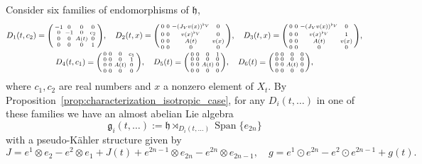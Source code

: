 \documentclass{article}
\theoremstyle{definition}
\newcommand{\frh}{\mathfrak{h}}
\newcommand{\Span}[1]{\operatorname{Span}\{#1\}}
\newcommand{\lie}[1]{\mathfrak{#1}}
\newcommand{\g}{\lie g}
\newenvironment{smallpmatrix}{\left(\begin{smallmatrix}}{\end{smallmatrix}\right)}
\begin{document}
\begin{itemize}
    Consider six families of endomorphisms of $\frh$,\begin{gather*}
    D_1(t,c_2)=\begin{smallpmatrix}
        -1 & 0 & 0 & 0\\
        0 & -1 & 0 & c_2\\
        0 & 0& A(t) & 0\\
        0 & 0 & 0 & 1
    \end{smallpmatrix},\quad D_2(t,x)=\begin{smallpmatrix}
        0 & 0 & -(J_Vv(x))^{\flat_V} & 0\\
        0 & 0 & v(x)^{\flat_V} & 0\\
        0 & 0& A(t) & v(x)\\
        0 & 0 & 0 & 0
    \end{smallpmatrix},\quad D_3(t,x)=\begin{smallpmatrix}
        0 & 0 & -(J_Vv(x))^{\flat_V} & 0\\
        0 & 0 & v(x)^{\flat_V} & 1\\
        0 & 0& A(t) & v(x)\\
        0 & 0 & 0 & 0
    \end{smallpmatrix},\\
    D_4(t,c_1)=\begin{smallpmatrix}
        0 & 0 & 0 & c_1\\
        0 & 0 & 0 & 1\\
        0 & 0& A(t) & 0\\
        0 & 0 & 0 & 0
    \end{smallpmatrix}, \quad D_5(t)=\begin{smallpmatrix}
        0 & 0 & 0 & 1\\
        0 & 0 & 0 & 0\\
        0 & 0& A(t) & 0\\
        0 & 0 & 0 & 0
    \end{smallpmatrix},\quad D_6(t)=\begin{smallpmatrix}
        0 & 0 & 0 & 0\\
        0 & 0 & 0 & 0\\
        0 & 0& A(t) & 0\\
        0 & 0 & 0 & 0
    \end{smallpmatrix},
    \end{gather*} where $c_1,c_2$ are real numbers and $x$ a nonzero element of $X_t$. By Proposition~\ref{prop:characterization_isotropic_case}, for any $D_i(t,\dots)$ in one of these families we have an almost abelian Lie algebra $$\g_i(t,\dots):=\frh\rtimes_{D_i(t,\dots)}\Span{e_{2n}}$$ with a pseudo-Kähler structure given by $$J=e^1\otimes e_2-e^2\otimes e_1+J(t)+e^{2n-1}\otimes e_{2n}-e^{2n}\otimes e_{2n-1}, \quad g=e^1\odot e^{2n}-e^2\odot e^{2n-1}+g(t).$$
\end{itemize}
\end{document}

